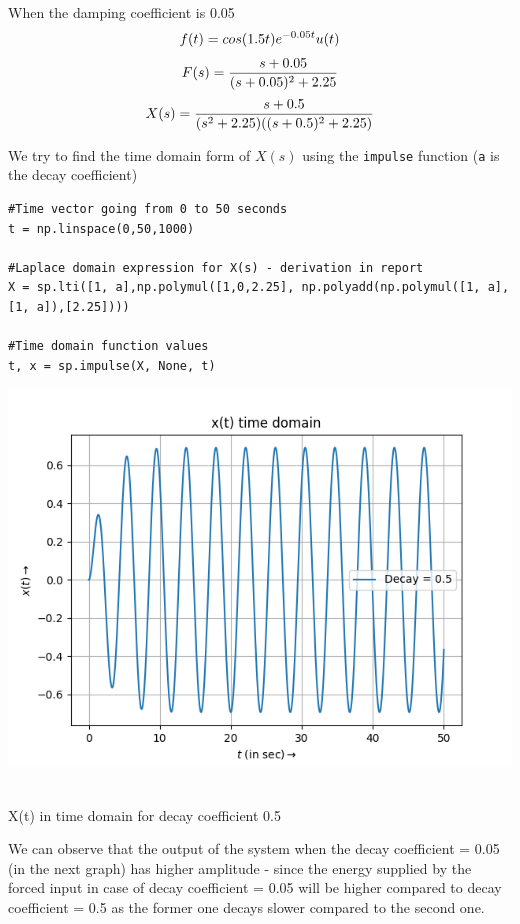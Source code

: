 \documentclass[12pt, a4paper]{report}
\begin{document}
When the damping coefficient is 0.05
\begin{equation*}
f(t) = cos(1.5t)e^{-0.05t}u(t)\\
\end{equation*}
\begin{equation*}
F(s) = \frac{s + 0.05}{(s+0.05)^2 + 2.25}\\
\end{equation*}
\begin{equation*}
X(s) = \frac{s+0.5}{(s^2 + 2.25)((s+0.5)^2 + 2.25)}\\
\end{equation*}

\clearpage
We try to find the time domain form of $X(s)$ using the \texttt{impulse} function
(\texttt{a} is the decay coefficient)
\begin{verbatim}
#Time vector going from 0 to 50 seconds 
t = np.linspace(0,50,1000)

#Laplace domain expression for X(s) - derivation in report
X = sp.lti([1, a],np.polymul([1,0,2.25], np.polyadd(np.polymul([1, a],[1, a]),[2.25])))

#Time domain function values 
t, x = sp.impulse(X, None, t)
\end{verbatim}

\begin{center}
	\includegraphics[scale=0.8]{Figure_0} 
	\caption{\\X(t) in time domain for decay coefficient 0.5}
	\label{fig:rawdata}
\end{center}


We can observe that the output of the system when the decay coefficient = 0.05 (in the next graph) has higher amplitude - since the energy supplied by the forced input in case of decay coefficient = 0.05 will be higher compared to decay coefficient = 0.5 as the former one decays slower compared to the second one.
\end{document}
